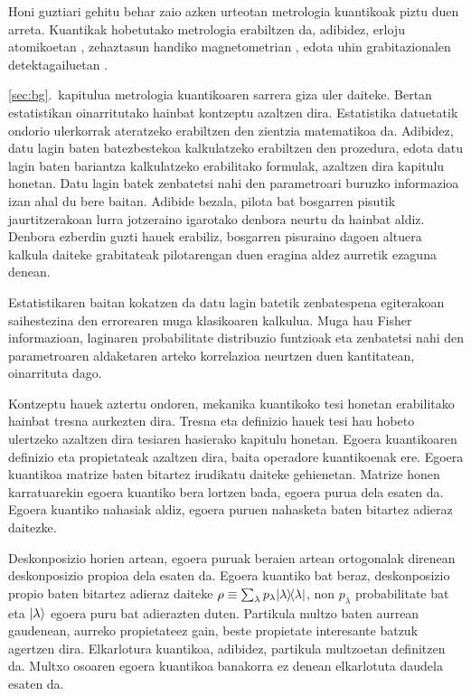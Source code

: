 Honi guztiari gehitu behar zaio azken urteotan metrologia kuantikoak piztu duen arreta.
Kuantikak hobetutako metrologia erabiltzen da, adibidez, erloju atomikoetan \cite{Louchet-Chauvet2010, Borregaard2013, Kessler2014a}, zehaztasun handiko magnetometrian \cite{Wasilewski2010, Eckert2006, Wildermuth2006, Wolfgramm2010, Koschorreck2011, Vengalattore2007, Zhou2010}, edota uhin grabitazionalen detektagailuetan \cite{Schnabel2010, TheLIGOScientificCollaboration2011, Demkowicz-Dobrzanski2013}.

\ref{sec:bg}.~kapitulua metrologia kuantikoaren sarrera giza uler daiteke.
Bertan estatistikan oinarritutako hainbat kontzeptu azaltzen dira.
Estatistika datuetatik ondorio ulerkorrak ateratzeko erabiltzen den zientzia matematikoa da.
Adibidez, datu lagin baten batezbestekoa kalkulatzeko erabiltzen den prozedura,
edota datu lagin baten bariantza kalkulatzeko erabilitako formulak, azaltzen dira kapitulu honetan.
Datu lagin batek zenbatetsi nahi den parametroari buruzko informazioa izan ahal du bere baitan.
Adibide bezala, pilota bat bosgarren pisutik jaurtitzerakoan lurra jotzeraino igarotako denbora neurtu da hainbat aldiz.
Denbora ezberdin guzti hauek erabiliz, bosgarren pisuraino dagoen altuera kalkula daiteke grabitateak pilotarengan duen eragina aldez aurretik ezaguna denean.

Estatistikaren baitan kokatzen da datu lagin batetik zenbatespena egiterakoan saihestezina den errorearen muga klasikoaren kalkulua.
Muga hau Fisher informazioan, laginaren probabilitate distribuzio funtzioak eta zenbatetsi nahi den parametroaren aldaketaren arteko korrelazioa neurtzen duen kantitatean, oinarrituta dago.

Kontzeptu hauek aztertu ondoren, mekanika kuantikoko tesi honetan erabilitako hainbat tresna aurkezten dira.
Tresna eta definizio hauek tesi hau hobeto ulertzeko azaltzen dira tesiaren hasierako kapitulu honetan.
Egoera kuantikoaren definizio eta propietateak azaltzen dira, baita operadore kuantikoenak ere.
Egoera kuantikoa matrize baten bitartez irudikatu daiteke gehienetan.
Matrize honen karratuarekin egoera kuantiko bera lortzen bada, egoera purua dela esaten da.
Egoera kuantiko nahasiak aldiz, egoera puruen nahasketa baten bitartez adieraz daitezke.

Deskonposizio horien artean, egoera puruak beraien artean ortogonalak direnean deskonposizio propioa dela esaten da.
Egoera kuantiko bat beraz, deskonposizio propio baten bitartez adieraz daiteke $\rho\equiv\sum_\lambda p_\lambda \vert{\lambda}\rangle{\!}\langle{\lambda}\vert$, non $p_\lambda$ probabilitate bat eta $\vert{\lambda}\rangle$ egoera puru bat adierazten duten.
Partikula multzo baten aurrean gaudenean, aurreko propietateez gain, beste propietate interesante batzuk agertzen dira.
Elkarlotura kuantikoa, adibidez, partikula multzoetan definitzen da.
Multxo osoaren egoera kuantikoa banakorra ez denean elkarlotuta daudela esaten da.

